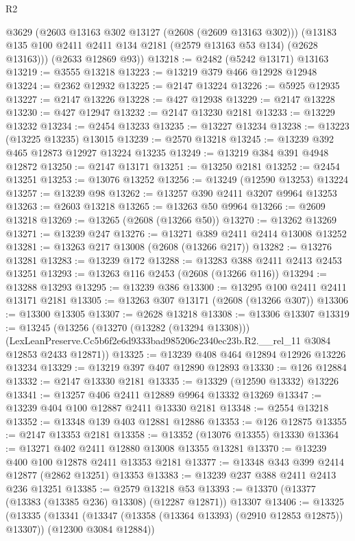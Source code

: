 \begin{lexlean}{R2}
\begin{coremodule}
        @3629
        (@2603 @13163 @302 @13127 (@2608 (@2609 @13163 @302)))
        (@13183 @135 @100 @2411 @2411 @134 @2181 (@2579 @13163 @53 @134) (@2628 @13163)))
      (@2633 @12869 @93))
@13218 := @2482 (@5242 @13171) @13163
@13219 := @3555 @13218
@13223 := @13219 @379 @466 @12928 @12948
@13224 := @2362 @12932
@13225 := @2147 @13224
@13226 := @5925 @12935
@13227 := @2147 @13226
@13228 := @427 @12938
@13229 := @2147 @13228
@13230 := @427 @12947
@13232 := @2147 @13230 @2181
@13233 := @13229 @13232
@13234 := @2454 @13233
@13235 := @13227 @13234
@13238 := @13223 (@13225 @13235) @13015
@13239 := @2570 @13218
@13245 := @13239 @392 @465 @12873 @12927 @13224 @13235
@13249 := @13219 @384 @391 @4948 @12872
@13250 := @2147 @13171
@13251 := @13250 @2181
@13252 := @2454 @13251
@13253 := @13076 @13252
@13256 := @13249 (@12590 @13253) @13224
@13257 := @13239 @98
@13262 := @13257 @390 @2411 @3207 @9964 @13253
@13263 := @2603 @13218
@13265 := @13263 @50 @9964
@13266 := @2609 @13218
@13269 := @13265 (@2608 (@13266 @50))
@13270 := @13262 @13269
@13271 := @13239 @247
@13276 := @13271 @389 @2411 @2414 @13008 @13252
@13281 := @13263 @217 @13008 (@2608 (@13266 @217))
@13282 := @13276 @13281
@13283 := @13239 @172
@13288 := @13283 @388 @2411 @2413 @2453 @13251
@13293 := @13263 @116 @2453 (@2608 (@13266 @116))
@13294 := @13288 @13293
@13295 := @13239 @386
@13300 := @13295 @100 @2411 @2411 @13171 @2181
@13305 := @13263 @307 @13171 (@2608 (@13266 @307))
@13306 := @13300 @13305
@13307 := @2628 @13218
@13308 := @13306 @13307
@13319 := @13245
    (@13256
      (@13270 (@13282 (@13294 @13308)))
      (LexLeanPreserve.Cc5b6f2e6d9333bad985206c2340ec23b.R2.__rel_11 @3084 @12853 @2433 @12871))
@13325 := @13239 @408 @464 @12894 @12926 @13226 @13234
@13329 := @13219 @397 @407 @12890 @12893
@13330 := @126 @12884
@13332 := @2147 @13330 @2181
@13335 := @13329 (@12590 @13332) @13226
@13341 := @13257 @406 @2411 @12889 @9964 @13332 @13269
@13347 := @13239 @404 @100 @12887 @2411 @13330 @2181
@13348 := @2554 @13218
@13352 := @13348 @139 @403 @12881 @12886
@13353 := @126 @12875
@13355 := @2147 @13353 @2181
@13358 := @13352 (@13076 @13355) @13330
@13364 := @13271 @402 @2411 @12880 @13008 @13355 @13281
@13370 := @13239 @400 @100 @12878 @2411 @13353 @2181
@13377 := @13348 @343 @399 @2414 @12877 (@2862 @13251) @13353
@13383 := @13239 @237 @388 @2411 @2413 @236 @13251
@13385 := @2579 @13218 @53
@13393 := @13370 (@13377 (@13383 (@13385 @236) @13308) (@12287 @12871)) @13307
@13406 := @13325
    (@13335
      (@13341 (@13347 (@13358 (@13364 @13393) (@2910 @12853 @12875)) @13307))
      (@12300 @3084 @12884))

\end{coremodule}
\end{lexlean}
